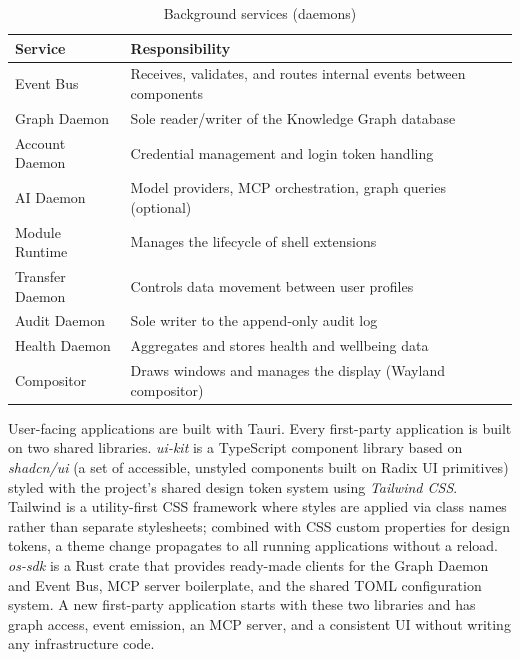 \begin{table}[htbp]
\caption{Background services (daemons)}
\label{tab:daemons}
\begin{tabularx}{\linewidth}{lX}
\toprule
\textbf{Service} & \textbf{Responsibility} \\
\midrule
Event Bus       & Receives, validates, and routes internal events between components \\
Graph Daemon    & Sole reader/writer of the Knowledge Graph database \\
Account Daemon  & Credential management and login token handling \\
AI Daemon       & Model providers, MCP orchestration, graph queries (optional) \\
Module Runtime  & Manages the lifecycle of shell extensions \\
Transfer Daemon & Controls data movement between user profiles \\
Audit Daemon    & Sole writer to the append-only audit log \\
Health Daemon   & Aggregates and stores health and wellbeing data \\
Compositor      & Draws windows and manages the display (Wayland compositor) \\
\bottomrule
\end{tabularx}
\end{table}

User-facing applications are built with Tauri. Every first-party application
is built on two shared libraries. \emph{ui-kit} is a TypeScript component
library based on \emph{shadcn/ui} (a set of accessible, unstyled components
built on Radix UI primitives) styled with the project's shared design token
system using \emph{Tailwind CSS}. Tailwind is a utility-first CSS framework
where styles are applied via class names rather than separate stylesheets;
combined with CSS custom properties for design tokens, a theme change propagates
to all running applications without a reload. \emph{os-sdk} is a Rust crate that
provides ready-made clients for the Graph Daemon and Event Bus, MCP server
boilerplate, and the shared TOML configuration system. A new first-party
application starts with these two libraries and has graph access, event
emission, an MCP server, and a consistent UI without writing any infrastructure
code.

